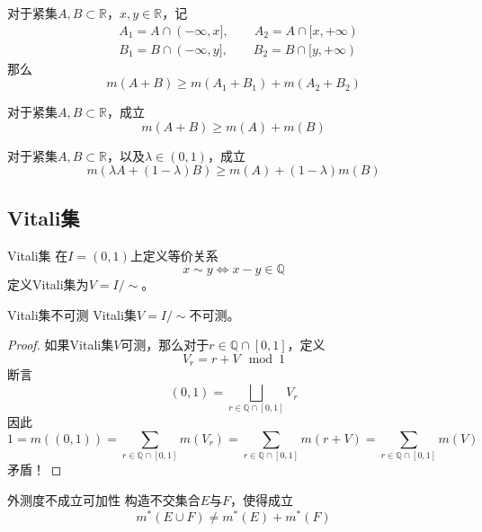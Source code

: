 \documentclass[lang = cn, scheme = chinese, thmcnt = section]{elegantbook}
\newcommand{\R}{\mathbb{R}}            %
\newcommand{\Q}{\mathbb{Q}}            %
\newcommand{\sub}{\subset}             %
\begin{document}
\begin{exercise}
	对于紧集$A,B\sub\R$，$x,y\in\R$，记
	\begin{align*}
		& A_1=A\cap(-\infty,x],\qquad A_2=A\cap[x,+\infty)\\
		& B_1=B\cap(-\infty,y],\qquad B_2=B\cap[y,+\infty)
	\end{align*}
	那么
	$$
	m(A+B)\ge m(A_1+B_1)+m(A_2+B_2)
	$$
\end{exercise}

\begin{exercise}
	对于紧集$A,B\sub\R$，成立
	$$
	m(A+B)\ge m(A)+m(B)
	$$
\end{exercise}

\begin{exercise}
	对于紧集$A,B\sub\R$，以及$\lambda\in(0,1)$，成立
	$$
	m(\lambda A+(1-\lambda)B)\ge m(A)+(1-\lambda)m(B)
	$$
\end{exercise}

\subsection{Vitali集}

\begin{definition}{Vitali集}
	在$I=(0,1)$上定义等价关系%
	$$
	x\sim y\iff x-y\in\Q
	$$
	定义Vitali集为$V=I/\sim$。
\end{definition}

\begin{theorem}{Vitali集不可测}
	Vitali集$V=I/\sim$不可测。
\end{theorem}

\begin{proof}
	如果Vitali集$V$可测，那么对于$r\in \Q\cap[0,1]$，定义%
	$$
	V_r=r+V\mod 1
	$$
	断言
	$$
	(0,1)=\bigsqcup_{r\in \Q\cap[0,1]}V_r
	$$
	因此%
	$$
	1=m((0,1))=\sum_{r\in \Q\cap[0,1]}m(V_r)
	=\sum_{r\in \Q\cap[0,1]}m(r+V)
	=\sum_{r\in \Q\cap[0,1]}m(V)
	$$
	矛盾！
\end{proof}

\begin{theorem}{外测度不成立可加性}
	构造不交集合$E$与$F$，使得成立
	$$
	m^*(E\cup F)\ne m^*(E)+m^*(F)
	$$
\end{theorem}
\end{document}

